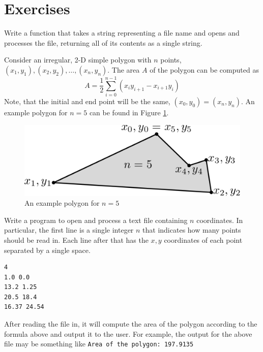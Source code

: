 

\section{Exercises}

\begin{exer}
Write a function that takes a string representing a file name and
opens and processes the file, returning all of its contents as a single
string.
\end{exer}

\begin{exer}
Consider an irregular, 2-D simple polygon with $n$ points, 
$(x_1, y_1), (x_2, y_2), \ldots, (x_n, y_n)$.  The area $A$ of the 
polygon can be computed as
$$A = \frac{1}{2} \sum_{i=0}^{n-1} (x_iy_{i+1} - x_{i+1}y_i)$$
Note, that the initial and end point will be the same, $(x_0, y_0) =
(x_n,y_n)$.  An example polygon for $n = 5$ can be found in 
Figure \ref{fig:polygonEx}.

\begin{figure}[h]
\centering
\includegraphics[scale=.5]{images/polygonEx}
\caption{An example polygon for $n=5$}
\label{fig:polygonEx}
\end{figure}

Write a program to open and process a text file containing
$n$ coordinates.  In particular, the first line is a single integer 
$n$ that indicates how many points should be read in.  Each 
line after that has the $x, y$ coordinates of each point separated 
by a single space.

\begin{verbatim}
4
1.0 0.0
13.2 1.25
20.5 18.4
16.37 24.54
\end{verbatim}

After reading the file in, it will compute the area of the polygon 
according to the formula above and output it to the user.  For example, 
the output for the above file may be something like \texttt{Area of the polygon: 197.9135}
\end{exer}

